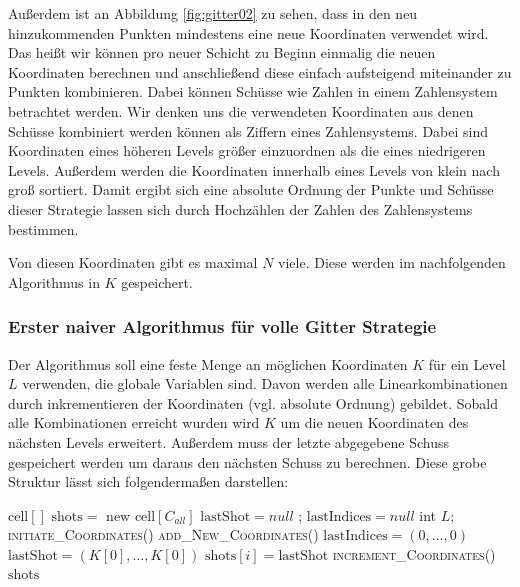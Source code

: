 \documentclass[a4paper,12pt]{llncs}
\numberwithin{equation}{section}
\begin{document}
Außerdem ist an Abbildung \ref{fig:gitter02} zu sehen, dass in den neu hinzukommenden Punkten mindestens eine neue Koordinaten verwendet wird. Das heißt wir können pro neuer Schicht zu Beginn einmalig die neuen Koordinaten berechnen und anschließend diese einfach aufsteigend miteinander zu Punkten kombinieren. Dabei können Schüsse wie Zahlen in einem Zahlensystem betrachtet werden. Wir denken uns die verwendeten Koordinaten aus denen Schüsse kombiniert werden können als Ziffern eines Zahlensystems. Dabei sind Koordinaten eines höheren Levels größer einzuordnen als die eines niedrigeren Levels. Außerdem werden die Koordinaten innerhalb eines Levels von klein nach groß sortiert. Damit ergibt sich eine absolute Ordnung der Punkte und Schüsse dieser Strategie lassen sich durch Hochzählen der Zahlen des Zahlensystems bestimmen.

Von diesen Koordinaten gibt es maximal $N$ viele. Diese werden im nachfolgenden Algorithmus in $K$ gespeichert.

\subsubsection{Erster naiver Algorithmus für volle Gitter Strategie}

Der Algorithmus soll eine feste Menge an möglichen Koordinaten $K$ für ein Level $L$ verwenden, die globale Variablen sind. Davon werden alle Linearkombinationen durch inkrementieren der Koordinaten (vgl. absolute Ordnung) gebildet. Sobald alle Kombinationen erreicht wurden wird $K$ um die neuen Koordinaten des nächsten Levels erweitert. Außerdem muss der letzte abgegebene Schuss gespeichert werden um daraus den nächsten Schuss zu berechnen. Diese grobe Struktur lässt sich folgendermaßen darstellen:

\begin{tcolorbox}
	\begin{algorithmic}
		\State $\text{cell}[]\text{ shots} = \text{ new } \text{cell}[C_{all}]$
		\State $\text{lastShot}=null$ ; $\text{lastIndices}=null$
		\State int $L$;
		\State \textsc{initiate\_Coordinates}()
		\EndIf
		\State \textsc{add\_New\_Coordinates}()
		\EndIf
		\State $\text{lastIndices} = (0,\dots,0)$
		\State $\text{lastShot} = (K[0],\dots,K[0])$
		\State $\text{shots}[i] = \text{lastShot}$
		\Else
		\State \textsc{increment\_Coordinates}()
		\EndIf
		\EndFor
		\State\Return $\text{shots}$
		\EndFunction
	\end{algorithmic}
\end{tcolorbox}
\end{document}
